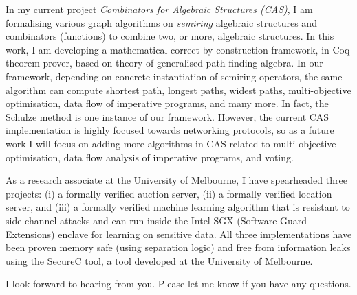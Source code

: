 \documentclass[11pt,a4paper,roman]{moderncv}
\begin{document}
\vspace{0.5cm}
In my current project \emph{Combinators for Algebraic Structures (CAS)},
I am formalising various graph algorithms on \emph{semiring} algebraic structures 
and combinators (functions) to 
combine two, or more, algebraic structures. In this work, I am developing 
a mathematical correct-by-construction  
framework, in Coq theorem prover, based on theory of generalised path-finding algebra. 
In our framework, depending on concrete instantiation 
of semiring operators, the same algorithm can compute shortest path, longest paths, 
widest paths, multi-objective optimisation, data flow of imperative programs, and many more. 
In fact, the Schulze method is one instance of our framework. However, 
the current CAS implementation is highly focused towards networking protocols,
so as a future work I will focus on adding more algorithms in CAS related 
to multi-objective optimisation, data flow analysis of imperative programs, and voting. 

\vspace{0.5cm}
As a research associate at the University of Melbourne, I have spearheaded three projects:
 (i) a formally verified auction server, (ii) a formally
 verified location server, and (iii) a formally verified machine learning 
 algorithm that is resistant to side-channel attacks and can  
 run inside the Intel SGX (Software Guard Extensions) enclave for learning
 on sensitive data. All three implementations have been proven 
 memory safe (using separation logic) and free from information
 leaks using the SecureC tool, a tool developed at the University of Melbourne.

I look forward to hearing from you. Please let me know if you have any questions. \\
 

\vspace{0.5cm}


\makeletterclosing
\end{document}
